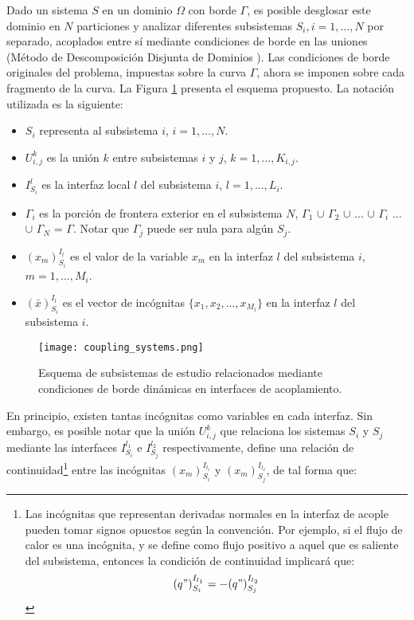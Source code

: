 Dado un sistema $S$ en un dominio $\Omega$ con borde $\Gamma$, es posible desglosar este dominio en $N$ particiones 
y analizar diferentes subsistemas $S_i,i=1,...,N$ por separado, acoplados entre sí mediante condiciones de borde en las uniones
(Método de Descomposición Disjunta de Dominios \cite{ddmethod}).
Las condiciones de borde originales del problema, impuestas sobre la curva $\Gamma$,
ahora se imponen sobre cada fragmento de la curva.
La Figura \ref{esquema-acoplamiento} presenta el esquema propuesto.
La notación utilizada es la siguiente:
\begin{itemize}
\item $S_i$ representa al subsistema $i$, $i=1,...,N$.
\item $U_{i,j}^k$ es la unión $k$ entre subsistemas $i$ y $j$, $k=1,...,K_{i,j}$.
\item $I_{S_i}^{l}$ es la interfaz local $l$ del subsistema $i$, $l=1,...,L_i$.
\item $\Gamma_i$ es la porción de frontera exterior en el subsistema $N$,
 $\Gamma_1$ $\cup$ $\Gamma_2$ $\cup$ ... $\cup$ $\Gamma_i$ ...  $\cup$ $\Gamma_N$ = $\Gamma$.
 Notar que $\Gamma_j$ puede ser nula para algún $S_j$.
\item ${(x_m)_{S_i}^{I_l}}$ es el valor de la variable $x_m$ en la interfaz ${l}$ del subsistema ${i}$, $m=1,...,M_i$.
\item ${(\bar{x})_{S_i}^{I_l}}$ es el vector de incógnitas $\{x_1,x_2,...,x_{M_i}\}$ en la interfaz ${l}$ del subsistema ${i}$.
\end{itemize}

\begin{figure}[ht]
\centering{}\texttt{[image: coupling\_systems.png]}
\caption[Esquema de descomposición disjunta de dominios]
{Esquema de subsistemas de estudio relacionados mediante condiciones de borde dinámicas en interfaces de acoplamiento.} 
\label{esquema-acoplamiento} 
\end{figure}

En principio, existen tantas incógnitas como variables en cada interfaz.
Sin embargo, es posible notar que la unión $U_{i,j}^k$ que relaciona los sistemas $S_{i}$ y $S_{j}$ 
mediante las interfaces $I_{S_{i}}^{l_1}$ e $I_{S_{j}}^{l_2}$ respectivamente, 
define una relación de continuidad\footnote{
Las incógnitas que representan derivadas normales en la interfaz de acople pueden tomar signos opuestos según la convención.
Por ejemplo, si el flujo de calor es una incógnita, 
y se define como flujo positivo a aquel que es saliente del subsistema, 
entonces la condición de continuidad implicará que:
\begin{equation*}
{(q")_{S_i}^{I_{l_1}}}=-{(q")_{S_j}^{I_{l_2}}}
\label{continuidad-q}
\end{equation*}
} entre las incógnitas ${(x_m)_{S_i}^{I_{l_1}}}$ y ${(x_m)_{S_j}^{I_{l_2}}}$, de tal forma que:


